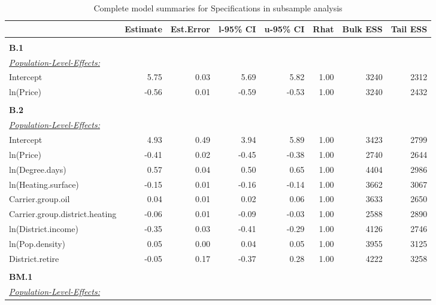 \documentclass[12pt,twoside]{reedthesis}
\begin{document}
\tiny
\begin{longtable}[c]{lrrrrrrr}
\caption{Complete model summaries for Specifications in subsample analysis}
\label{tab:brms-full-model-results}\\
\cline{2-8}
 & \multicolumn{1}{c}{\textbf{Estimate}} & \multicolumn{1}{c}{\textbf{Est.Error}} & \multicolumn{1}{c}{\textbf{l-95\% CI}} & \multicolumn{1}{c}{\textbf{u-95\% CI}} & \multicolumn{1}{c}{\textbf{Rhat}} & \multicolumn{1}{c}{\textbf{Bulk ESS}} & \multicolumn{1}{c}{\textbf{Tail ESS}} \\ \cline{2-8} 
\endfirsthead
%
\endhead
%
\hline
\endfoot
%
\endlastfoot
%
 &  &  &  &  &  &  &  \\ \hline
\textbf{B.1} &  &  &  &  &  &  &  \\
{\ul \textit{Population-Level-Effects:}} &  &  &  &  &  &  &  \\
Intercept & 5.75 & 0.03 & 5.69 & 5.82 & 1.00 & 3240 & 2312 \\
ln(Price) & -0.56 & 0.01 & -0.59 & -0.53 & 1.00 & 3240 & 2432 \\ \hline
 &  &  &  &  &  &  &  \\ \hline
\textbf{B.2} &  &  &  &  &  &  &  \\
{\ul \textit{Population-Level-Effects:}} &  &  &  &  &  &  &  \\
Intercept & 4.93 & 0.49 & 3.94 & 5.89 & 1.00 & 3423 & 2799 \\
ln(Price) & -0.41 & 0.02 & -0.45 & -0.38 & 1.00 & 2740 & 2644 \\
ln(Degree.days) & 0.57 & 0.04 & 0.50 & 0.65 & 1.00 & 4404 & 2986 \\
ln(Heating.surface) & -0.15 & 0.01 & -0.16 & -0.14 & 1.00 & 3662 & 3067 \\
Carrier.group.oil & 0.04 & 0.01 & 0.02 & 0.06 & 1.00 & 3633 & 2650 \\
Carrier.group.district.heating & -0.06 & 0.01 & -0.09 & -0.03 & 1.00 & 2588 & 2890 \\
ln(District.income) & -0.35 & 0.03 & -0.41 & -0.29 & 1.00 & 4126 & 2746 \\
ln(Pop.density) & 0.05 & 0.00 & 0.04 & 0.05 & 1.00 & 3955 & 3125 \\
District.retire & -0.05 & 0.17 & -0.37 & 0.28 & 1.00 & 4222 & 3258 \\ \hline
 &  &  &  &  &  &  &  \\ \hline
\textbf{BM.1} &  &  &  &  &  &  &  \\
{\ul \textit{Population-Level-Effects:}} &  &  &  &  &  &  &  \\

\end{longtable}
\end{document}
